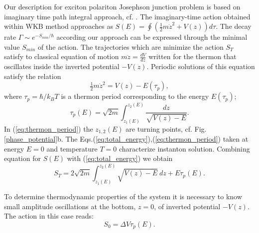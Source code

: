 \documentclass[aps, pre, preprint, groupedaddress, superscriptaddress, showkeys, showpacs] {revtex4-1}
\begin{document}
Our description for exciton polariton Josephson junction problem is based on imaginary time path integral approach, cf. \cite{Ankerhold}.
The imaginary-time action obtained within WKB method approaches as $S(E) = \oint (\tfrac{1}{2} m \dot{z}^2 + V(z)) d \tau$.
%
%
The decay rate $\Gamma \sim e^{-S_{min}/\hbar}$ according our approach can be expressed through the minimal value $S_{min}$ of the action.
The trajectories which are minimize the action $S_T$ satisfy to classical equation of motion $m \ddot{z} = \frac{d V}{dz}$ written for the thermon that  oscillates inside the inverted potential $-V(z)$. 
%
%
Periodic solutions of this equation satisfy the relation
%
\begin{equation}
\tfrac{1}{2} m \dot{z}^2 = V(z) - E(\tau_p),
\label{eq:total_energy}
\end{equation}
%
where $\tau_p = \hbar / k_B T$ is a thermon period corresponding to the energy $E(\tau_p)$;
%
\begin{equation}
\tau_p(E) = \sqrt{2 m} \int_{z_1(E)}^{z_2(E)} \frac{dz}{\sqrt{V(z) - E}}.
\label{eq:thermon_period}
\end{equation}
%
In (\ref{eq:thermon_period}) the $z_{1,2}(E)$ are turning points, cf. Fig. \ref{phase_potential}b.
The Eqs.(\ref{eq:total_energy}),(\ref{eq:thermon_period}) taken at energy $E = 0$ and temperature $T = 0$ characterize instanton solution.
Combining  equation for $S(E)$ 
with (\ref{eq:total_energy}) we obtain  
%
\begin{equation}
S_T = 2 \sqrt{2 m} \int_{z_1(E)}^{z_2(E)} \sqrt{V(z) - E} ~dz + E \tau_p (E).
\label{eq:thermon_action_2}
\end{equation}
%

To determine thermodynamic properties of the system it is necessary to know small amplitude oscillations  at the bottom, $z=0$, of inverted potential $-V(z)$.
The action in this case reads: 
%
\begin{equation}
S_0 = \Delta V \tau_p (E).
\label{eq:thermal_action}
\end{equation}
%
\end{document}
